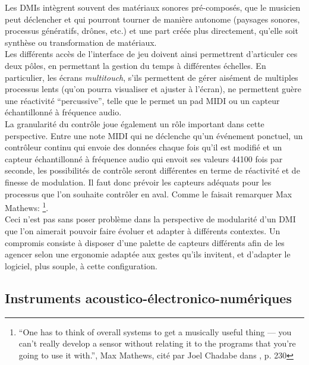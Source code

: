 \noindent Les \glspl{DMI} intègrent souvent des matériaux sonores pré-composés, que le musicien peut déclencher et qui pourront tourner de manière autonome (paysages sonores, processus génératifs, drônes, etc.) et une part créée plus directement, qu'elle soit synthèse ou transformation de matériaux.\\
\indent Les différents accès de l'interface de jeu doivent ainsi permettrent d'articuler ces deux pôles, en permettant la gestion du temps à différentes échelles. En particulier, les écrans \textit{multitouch}, s'ils permettent de gérer aisément de multiples processus lents (qu'on pourra visualiser et ajuster à l'écran), ne permettent guère une réactivité ``percussive'', telle que le permet un pad \gls{MIDI} ou un capteur échantillonné à fréquence audio.\\
\indent La granularité du contrôle joue également un rôle important dans cette perspective. Entre une note \gls{MIDI} qui ne déclenche qu'un événement ponctuel, un contrôleur continu qui envoie des données chaque fois qu'il est modifié et un capteur échantillonné à fréquence audio qui envoit ses valeurs 44100 fois par seconde, les possibilités de contrôle seront différentes en terme de réactivité et de finesse de modulation. Il faut donc prévoir les capteurs adéquats pour les processus que l'on souhaite contrôler en aval. Comme le faisait remarquer Max Mathews: \footnote{``One has to think of overall systems to get a musically useful thing — you can't really develop a sensor without relating it to the programs that you're going to use it with.'', Max Mathews, cité par Joel Chadabe dans \cite{chadabe_electric_1996}, p. 230}.\\
\indent Ceci n'est pas sans poser problème dans la perspective de modularité d'un \gls{DMI} que l'on aimerait pouvoir faire évoluer et adapter à différents contextes. Un compromis consiste à disposer d'une palette de capteurs différents afin de les agencer selon une ergonomie adaptée aux gestes qu'ils invitent, et d'adapter le logiciel, plus souple, à cette configuration. 

\subsection{Instruments acoustico-électronico-numériques}

